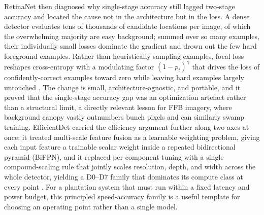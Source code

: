 RetinaNet then diagnosed why single-stage accuracy still lagged two-stage accuracy and located the cause not in the architecture but in the loss. A dense detector evaluates tens of thousands of candidate locations per image, of which the overwhelming majority are easy background; summed over so many examples, their individually small losses dominate the gradient and drown out the few hard foreground examples. Rather than heuristically sampling examples, focal loss reshapes cross-entropy with a modulating factor $(1-p_t)^\gamma$ that drives the loss of confidently-correct examples toward zero while leaving hard examples largely untouched \cite{lin2017focal}. The change is small, architecture-agnostic, and portable, and it proved that the single-stage accuracy gap was an optimization artefact rather than a structural limit, a directly relevant lesson for FFB imagery, where background canopy vastly outnumbers bunch pixels and can similarly swamp training. EfficientDet carried the efficiency argument further along two axes at once: it treated multi-scale feature fusion as a learnable weighting problem, giving each input feature a trainable scalar weight inside a repeated bidirectional pyramid (BiFPN), and it replaced per-component tuning with a single compound-scaling rule that jointly scales resolution, depth, and width across the whole detector, yielding a D0--D7 family that dominates its compute class at every point \cite{tan2020efficientdet}. For a plantation system that must run within a fixed latency and power budget, this principled speed-accuracy family is a useful template for choosing an operating point rather than a single model.

